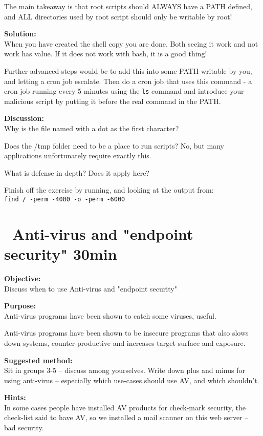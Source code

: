 \documentclass[a4paper,11pt,notitlepage]{report}
\begin{document}
The main takeaway is that root scripts should ALWAYS have a PATH defined, and ALL directories used by root script should only be writable by root!

{\bf Solution:}\\
When you have created the shell copy you are done. Both seeing it work and not work has value. If it does not work with bash, it is a good thing!

Further advanced steps would be to add this into some PATH writable by you, and letting a cron job escalate. Then do a cron job that uses this command - a cron job running every 5 minutes using the \verb+ls+ command and introduce your malicious script by putting it before the real command in the PATH.



{\bf Discussion:}\\
Why is the file named with a dot as the first character?

Does the /tmp folder need to be a place to run scripts? No, but many applications unfortunately require exactly this.

What is defense in depth? Does it apply here?

Finish off the exercise by running, and looking at the output from:\\
\verb+find / -perm -4000 -o -perm -6000+


\chapter{\faInfoCircle\ Anti-virus and "endpoint security" 30min}
\label{ex:anti-virus-end-point-security}

{\bf Objective:}\\
Discuss when to use Anti-virus and "endpoint security"

{\bf Purpose:}\\
Anti-virus programs have been shown to catch some viruses, useful.

Anti-virus programs have been shown to be insecure programs that also slows down systems, counter-productive and increases target surface and exposure.

{\bf Suggested method:}\\
Sit in groups 3-5 -- discuss among yourselves. Write down plus and minus for using anti-virus -- especially which use-cases should use AV, and which shouldn't.

{\bf Hints:}\\
In some cases people have installed AV products for check-mark security, the check-list said to have AV, so we installed a mail scanner on this web server -- bad security.
\end{document}
